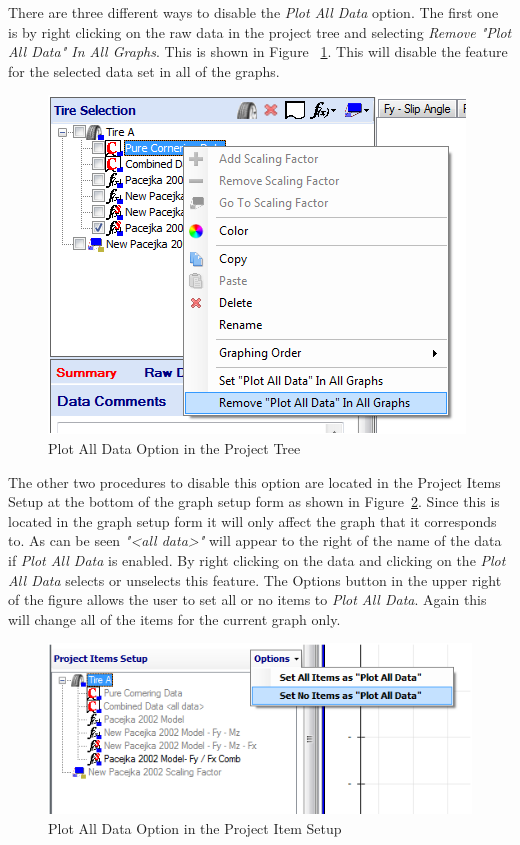 There are three different ways to disable the \textsl{Plot All Data} option. The first one is by right clicking on the raw data in the project tree and selecting \textsl{Remove "Plot All Data" In All Graphs}. This is shown in Figure ~\ref{fig:PlotAllData}. This will disable the feature for the selected data set in all of the graphs.

\begin{figure}[H]
	\centering
		\includegraphics{PlotAllData.png}
	\caption{Plot All Data Option in the Project Tree}
	\label{fig:PlotAllData}
\end{figure}

The other two procedures to disable this option are located in the Project Items Setup at the bottom of the graph setup form as shown in Figure~\ref{fig:PlotAllDataOption}. Since this is located in the graph setup form it will only affect the graph that it corresponds to. As can be seen \textsl{"<all data>"} will appear to the right of the name of the data if \textsl{Plot All Data} is enabled. By right clicking on the data and clicking on the \textsl{Plot All Data} selects or unselects this feature. The Options button in the upper right of the figure allows the user to set all or no items to \textsl{Plot All Data}. Again this will change all of the items for the current graph only. 

\begin{figure}[H]
	\centering
		\includegraphics{PlotAllDataOption.png}
	\caption{Plot All Data Option in the Project Item Setup}
	\label{fig:PlotAllDataOption}
\end{figure}

